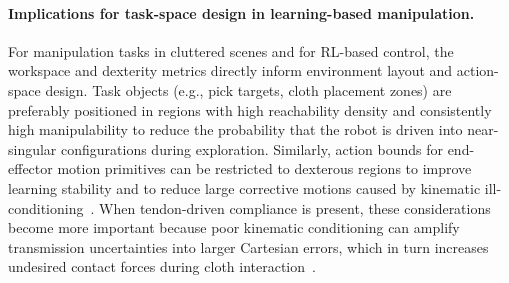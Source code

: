 \paragraph{Implications for task-space design in learning-based manipulation.}
For manipulation tasks in cluttered scenes and for \ac{RL}-based control, the workspace and dexterity metrics directly inform environment layout and action-space design. Task objects (e.g., pick targets, cloth placement zones) are preferably positioned in regions with high reachability density and consistently high manipulability to reduce the probability that the robot is driven into near-singular configurations during exploration. Similarly, action bounds for end-effector motion primitives can be restricted to dexterous regions to improve learning stability and to reduce large corrective motions caused by kinematic ill-conditioning~\cite{Yoshikawa1985Manipulability,Salisbury1982ArticulatedHands,Dong2013WorkspaceDensity}. When tendon-driven compliance is present, these considerations become more important because poor kinematic conditioning can amplify transmission uncertainties into larger Cartesian errors, which in turn increases undesired contact forces during cloth interaction~\cite{Miyasaka2020HysteresisFriction,Bicchi2004FastSoftArm}.


